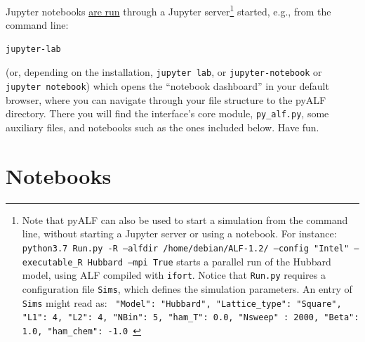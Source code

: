 \documentclass[10pt,modern]{scrartcl}
\numberwithin{exerciseitem}{exercise} %
\begin{document}
Jupyter notebooks \href{https://jupyter.readthedocs.io/en/latest/running.html}{are run} through a Jupyter server\footnote{Note that pyALF can also be used to start a simulation from the command line, without starting a Jupyter server or using a notebook. For instance: \texttt{python3.7 Run.py -R  --alfdir /home/debian/ALF-1.2/ --config "Intel"  --executable\_R Hubbard --mpi True} starts a parallel run of the Hubbard model, using ALF compiled with \texttt{ifort}.  Notice that \texttt{Run.py} requires a configuration file  \texttt{Sims}, which defines the simulation parameters. An entry of \texttt{Sims} might read as: \texttt{ {"Model": "Hubbard", "Lattice\_type": "Square", "L1": 4, "L2": 4, "NBin": 5, "ham\_T": 0.0, "Nsweep" : 2000, "Beta": 1.0, "ham\_chem": -1.0} } } started, e.g., from the command line:
\begin{lstlisting}[style=bash]
jupyter-lab
\end{lstlisting}
(or, depending on the installation, \texttt{jupyter lab}, or \texttt{jupyter-notebook} or \texttt{jupyter notebook})
which opens the ``notebook dashboard'' in your default browser, where you can navigate through your file structure to the pyALF directory. There you will find the interface's core module, \texttt{py\_alf.py}, some auxiliary files, and notebooks such as the ones included below. Have fun. 



\section*{Notebooks}
\end{document}
